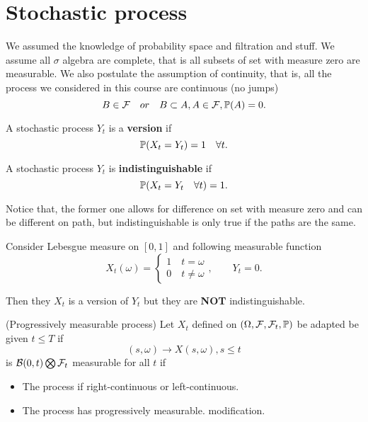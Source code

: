 \newpage

\section{Stochastic process}
We assumed the knowledge of probability space and filtration and stuff. We assume all $\sigma$ algebra are complete, that is all subsets of set with measure zero are measurable. We also postulate the assumption of continuity, that is, all the process we considered in this course are continuous (no jumps)
\begin{equation*}
    B\in \mathcal{F} \quad or\quad  B\subset A, A\in \mathcal{F}, \mathbb{P}(A)=0.
\end{equation*}
\begin{dfn}
A stochastic process $Y_t$ is a \textbf{version} if 
\begin{equation*}
    \mathbb{P}(X_t = Y_t) = 1 \quad \forall t.
\end{equation*}

A stochastic process $Y_t$ is \textbf{indistinguishable} if 
\begin{equation*}
    \mathbb{P}(X_t = Y_t \quad \forall t) = 1.
\end{equation*}
\end{dfn}
\begin{rem}

Notice that, the former one allows for difference on set with measure zero and can be different on path, but indistinguishable is only true if the paths are the same. 
\end{rem}
\begin{example}Consider Lebesgue measure on $[0,1]$ and following measurable function
\begin{equation*}
    X_t(\omega) = \begin{cases}
    1\quad t = \omega \\
    0 \quad t \neq \omega
    \end{cases}, \qquad Y_t = 0.
\end{equation*}
\end{example}
Then they $X_t$ is a version of $Y_t$ but they are \textbf{NOT} indistinguishable.

\begin{dfn}{(Progressively measurable process)}
Let $X_t$ defined on $(\Omega, \mathcal{F}, \mathcal{F}_t, \mathbb{P})$ be adapted be given $t\leq T$ if \begin{equation*}
    (s,\omega) \rightarrow X(s,\omega), s\leq t
\end{equation*} is $\mathcal{B}(0,t) \bigotimes \mathcal{F}_t$ measurable for all $t$ if
\begin{itemize}
    \item The process if right-continuous or left-continuous.
    \item The process has progressively measurable. modification.
\end{itemize}
\end{dfn}

